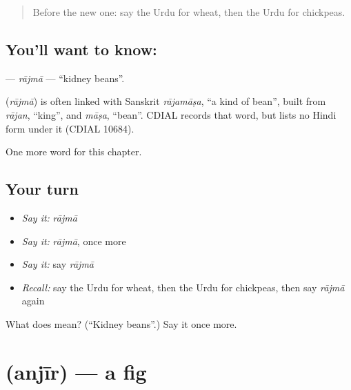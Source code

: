 \label{lesson:UR-C174-rajma}



\begin{quote}
Before the new one: say the Urdu for wheat, then the Urdu for chickpeas.
\end{quote}

\subsection*{You'll want to know: }
\textbf{} — \emph{rājmā} — \textquotedblleft{}kidney beans\textquotedblright{}.

\begin{cousinweb}
\textbf{} (\emph{rājmā}) is often linked with Sanskrit \emph{rājamāṣa}, \textquotedblleft{}a kind of bean\textquotedblright{}, built from \emph{rājan}, \textquotedblleft{}king\textquotedblright{}, and \emph{māṣa}, \textquotedblleft{}bean\textquotedblright{}. CDIAL records that word, but lists no Hindi form under it (CDIAL 10684).
\end{cousinweb}

\begin{grammarlens}[title={What you've built}]
One more word for this chapter.
\end{grammarlens}

\subsection*{Your turn}
\begin{itemize}
\raggedright
  \item \emph{Say it:} \emph{rājmā}
  \item \emph{Say it:} \emph{rājmā}, once more
  \item \emph{Say it:} say \emph{rājmā}
  \item \emph{Recall:} say the Urdu for wheat, then the Urdu for chickpeas, then say \emph{rājmā} again
\end{itemize}

\begin{tcolorbox}[breakable,colback=teal!4,colframe=teal!35!black,title={Before you move on}]
What does  mean? (\textquotedblleft{}Kidney beans\textquotedblright{}.) Say it once more.
\end{tcolorbox}
\section[\texorpdfstring{\ur{انجیر} (anjīr)}{انجیر (anjīr)}]{ (anjīr) — a fig}

